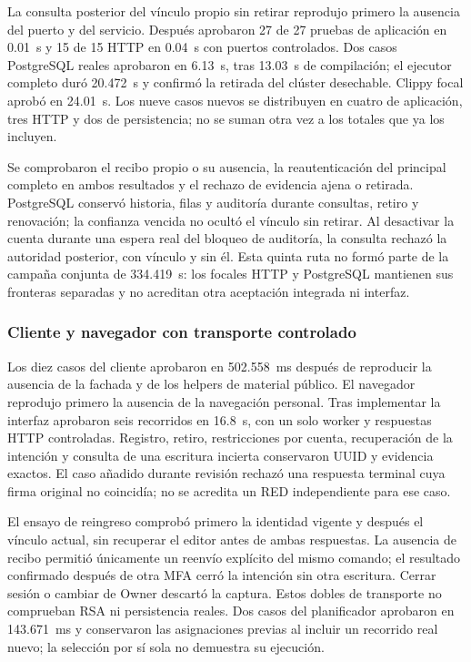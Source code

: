 La consulta posterior del vínculo propio sin retirar reprodujo primero la
ausencia del puerto y del servicio. Después aprobaron 27 de 27 pruebas de
aplicación en 0.01~s y 15 de 15 HTTP en 0.04~s con puertos controlados. Dos
casos PostgreSQL reales aprobaron en 6.13~s, tras 13.03~s de compilación; el
ejecutor completo duró 20.472~s y confirmó la retirada del clúster desechable.
Clippy focal aprobó en 24.01~s. Los nueve casos nuevos se distribuyen en
cuatro de aplicación, tres HTTP y dos de persistencia; no se suman otra vez
a los totales que ya los incluyen.

Se comprobaron el recibo propio o su ausencia, la reautenticación del principal
completo en ambos resultados y el rechazo de evidencia ajena o retirada.
PostgreSQL conservó historia, filas y auditoría durante consultas, retiro y
renovación; la confianza vencida no ocultó el vínculo sin retirar. Al desactivar
la cuenta durante una espera real del bloqueo de auditoría, la consulta rechazó
la autoridad posterior, con vínculo y sin él. Esta quinta ruta no formó parte
de la campaña conjunta de 334.419~s: los focales HTTP y PostgreSQL mantienen
sus fronteras separadas y no acreditan otra aceptación integrada ni interfaz.

\subsubsection{Cliente y navegador con transporte controlado}

Los diez casos del cliente aprobaron en 502.558~ms después de reproducir la
ausencia de la fachada y de los helpers de material público. El navegador
reprodujo primero la ausencia de la navegación personal. Tras implementar la
interfaz aprobaron seis recorridos en 16.8~s, con un solo worker y respuestas
HTTP controladas. Registro, retiro, restricciones por cuenta, recuperación de
la intención y consulta de una escritura incierta conservaron UUID y evidencia
exactos. El caso añadido durante revisión rechazó una respuesta terminal cuya
firma original no coincidía; no se acredita un RED independiente para ese caso.

El ensayo de reingreso comprobó primero la identidad vigente y después el
vínculo actual, sin recuperar el editor antes de ambas respuestas. La ausencia
de recibo permitió únicamente un reenvío explícito del mismo comando; el
resultado confirmado después de otra MFA cerró la intención sin otra escritura.
Cerrar sesión o cambiar de Owner descartó la captura. Estos dobles de transporte
no comprueban RSA ni persistencia reales. Dos casos del planificador aprobaron
en 143.671~ms y conservaron las asignaciones previas al incluir un recorrido
real nuevo; la selección por sí sola no demuestra su ejecución.

